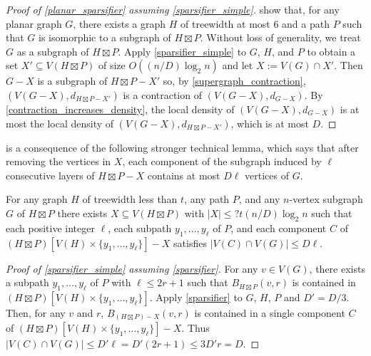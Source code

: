 \documentclass{patmorin}
\begin{document}
\begin{proof}[Proof of \cref{planar_sparsifier} assuming \cref{sparsifier_simple}]
  \citet{ueckerdt.wood.ea:improved} show that, for any planar graph $G$, there exists a graph $H$ of treewidth at most $6$ and a path $P$ such that $G$ is isomorphic to a subgraph of $H\boxtimes P$.  Without loss of generality, we treat $G$ as a subgraph of $H\boxtimes P$.  Apply \cref{sparsifier_simple} to $G$, $H$, and $P$ to obtain a set $X'\subseteq V(H\boxtimes P)$ of size $O((n/D)\log_2 n)$ and let $X:=V(G)\cap X'$.  Then $G-X$ is a subgraph of $H\boxtimes P-X'$ so, by \cref{supergraph_contraction}, $(V(G-X),d_{H\boxtimes P-X'})$ is a contraction of $(V(G-X),d_{G-X})$.  By \cref{contraction_increases_density}, the local density of $(V(G-X),d_{G-X})$ is at most the local density of $(V(G-X),d_{H\boxtimes P-X'})$, which is at most $D$.
\end{proof}

 is a consequence of the following stronger technical lemma, which says that after removing the vertices in $X$, each component of the subgraph induced by $\ell$ consecutive layers of $H\boxtimes P-X$ contains at most $D\ell$ vertices of $G$.

\begin{lem}\label{sparsifier}
  For any graph $H$ of treewidth less than $t$, any path $P$, and any $n$-vertex subgraph $G$ of $H\boxtimes P$ there exists $X\subseteq V(H\boxtimes P)$ with $|X|\le ?t(n/D)\log_2 n$ such that each positive integer $\ell$, each subpath $y_1,\ldots,y_\ell$ of $P$, and each component $C$ of $(H\boxtimes P)[V(H)\times \{y_1,\ldots,y_\ell\}]-X$ satisfies $|V(C)\cap V(G)|\le D\ell$.
\end{lem}

\begin{proof}[Proof of \cref{sparsifier_simple} assuming \cref{sparsifier}]
  For any $v\in V(G)$, there exists a subpath $y_1,\ldots,y_{\ell}$ of $P$ with $\ell\le 2r+1$ such that $B_{H\boxtimes P}(v,r)$ is contained in $(H\boxtimes P)[V(H)\times \{y_1,\ldots,y_{\ell}\}]$.  Apply \cref{sparsifier} to $G$, $H$, $P$ and $D'=D/3$.  Then, for any $v$ and $r$, $B_{(H\boxtimes P)-X}(v,r)$ is contained in a single component $C$ of $(H\boxtimes P)[V(H)\times \{y_1,\ldots,y_{\ell}\}]-X$.  Thus $|V(C)\cap V(G)|\le D'\ell= D'(2r+1)\le 3D'r=D$.
\end{proof}
\end{document}
